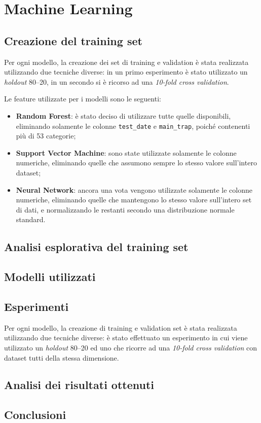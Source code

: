 \setcounter{chapter}{0}
\part{Machine Learning}
\chapter{Creazione del training set}
Per ogni modello, la creazione dei set di training e validation è stata 
realizzata utilizzando due tecniche diverse: in un primo esperimento è stato 
utilizzato un \textit{holdout} 80--20, in un secondo si è ricorso ad una 
\textit{10-fold cross validation}.

Le feature utilizzate per i modelli sono le seguenti:
\begin{itemize}
	\item \textbf{Random Forest}: è stato deciso di utilizzare tutte quelle 
	disponibili, eliminando solamente le colonne \texttt{test\_date} e 
	\texttt{main\_trap}, poiché contenenti più di 53 categorie;
	\item \textbf{Support Vector Machine}: sono state utilizzate solamente le 
	colonne numeriche, eliminando quelle che assumono sempre lo stesso 
	valore sull'intero dataset;
	\item \textbf{Neural Network}: ancora una vota vengono utilizzate solamente 
	le colonne numeriche, eliminando quelle che mantengono lo stesso valore 
	sull'intero set di dati, e	normalizzando le restanti secondo una 
	distribuzione normale standard.
\end{itemize} 

\chapter{Analisi esplorativa del training set}
\label{chap:analisi-training}

\chapter{Modelli utilizzati}


\chapter{Esperimenti}
Per ogni modello, la creazione di training e validation set è stata realizzata 
utilizzando due tecniche diverse: è stato effettuato un esperimento in cui 
viene utilizzato un \textit{holdout} 80--20 ed uno che ricorre ad una 
\textit{10-fold cross validation} con dataset tutti della stessa dimensione.


\chapter{Analisi dei risultati ottenuti}

\chapter{Conclusioni}
